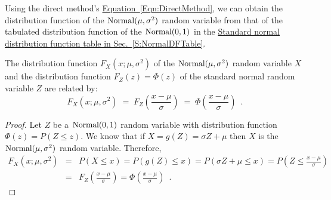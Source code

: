 Using the direct method's \hyperref[Eqn:DirectMethod]{Equation~\ref*{Eqn:DirectMethod}}, we can obtain the distribution function of the $\mbox{{\rm Normal}}(\mu,\sigma^2)$ random variable from that of the 
tabulated distribution function of the $\mbox{{\rm Normal}}(0,1)$ in the  \hyperref[S:NormalDFTable]{Standard normal distribution function table in Sec.~\ref*{S:NormalDFTable}}. 
  
\begin{figure}[htbp]
\end{figure}


\begin{prop}
The distribution function $F_X(x;\mu,\sigma^2)$ of the $\mbox{{\rm Normal}}(\mu,\sigma^2)$ random variable $X$ 
and the distribution function $F_Z(z)=\Phi(z)$  of the standard normal random variable $Z$ are related by:
$$F_X(x;\mu,\sigma^2)\;=\; F_Z\left(\frac{x -\mu}{\sigma}\right) \;=\; \Phi\left(\frac{x-\mu}{\sigma}\right)\enspace .$$

\begin{proof}
Let $Z$ be a $\mbox{{\rm Normal}}(0,1)$ random variable with distribution function $\Phi(z) = P (Z \leq z)$.  
We know that if $X=g(Z)=\sigma Z+\mu$ then $X$ is the $\mbox{{\rm Normal}}(\mu,\sigma^2)$ random variable.  
Therefore, 
\begin{eqnarray*}
F_X(x;\mu,\sigma^2) 
&=& P(X \leq x) = P\left( g(Z) \leq x \right) =  P (\sigma Z+\mu \leq x) = P\left(Z \leq \frac{x -\mu}{\sigma} \right)\\ 
&=& F_Z \left(\frac{x -\mu}{\sigma}\right) = \Phi \left(\frac{x -\mu}{\sigma}\right) \enspace .
\end{eqnarray*}
\end{proof}
\end{prop}

